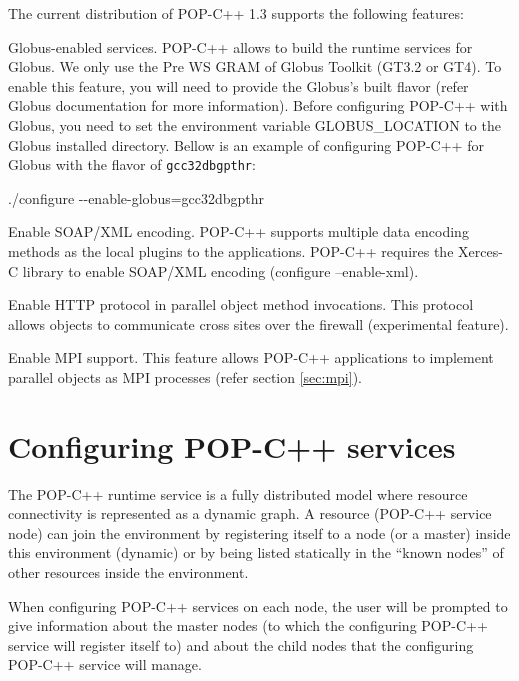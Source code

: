The current distribution of POP-C++ 1.3 supports the following features:
\begin{petitem}

\item Globus-enabled services. POP-C++ allows to build the runtime
services for Globus. We only use the Pre WS GRAM of Globus Toolkit
(GT3.2 or GT4).  To enable this feature, you will need to provide the
Globus's built flavor (refer Globus documentation for more information).
Before configuring POP-C++  with Globus, you need to set the environment
variable GLOBUS\_LOCATION to the Globus installed directory. Bellow is
an example of configuring POP-C++ for Globus with the flavor of
\texttt{gcc32dbgpthr}:

./configure -\--enable-globus=gcc32dbgpthr

\item Enable SOAP/XML encoding. POP-C++ supports multiple data encoding
methods as the local plugins to the applications. POP-C++ requires the
Xerces-C library to enable SOAP/XML encoding (configure --enable-xml).

\item Enable HTTP protocol in parallel object method invocations. This
protocol allows objects to communicate cross sites over the firewall
(experimental feature).    

\item Enable MPI support. This feature allows POP-C++ applications to implement
parallel objects as MPI processes (refer section \ref{sec:mpi}). 

\end{petitem}

\section{Configuring POP-C++ services}

The POP-C++ runtime service is a fully distributed model where resource connectivity is represented as a
dynamic graph. A resource (POP-C++ service node) can join the
environment  by registering itself to a node (or a master) inside this
environment (dynamic) or by being listed statically in the ``known
nodes'' of other resources inside the environment. 

When configuring POP-C++ services on each node, the user will be prompted to give information
about the master nodes (to which the configuring POP-C++ service will
register itself to) and about the child nodes that the configuring
POP-C++ service will manage. 

